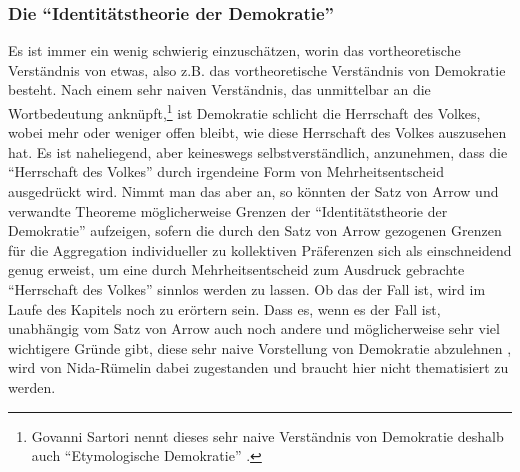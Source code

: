 \subsubsection{Die "`Identitätstheorie der Demokratie"'} 
    
Es ist immer ein wenig
schwierig einzuschätzen, worin das vortheoretische Verständnis von etwas, also
z.B. das vortheoretische Verständnis von Demokratie besteht. Nach einem sehr
naiven Verständnis, das unmittelbar an die Wortbedeutung
anknüpft,\footnote{Govanni Sartori nennt dieses sehr naive Verständnis
von Demokratie deshalb auch "`Etymologische Demokratie"' \cite[S.
29ff.]{sartori:1987}.} ist Demokratie schlicht die Herrschaft des Volkes, wobei
mehr oder weniger offen bleibt, wie diese Herrschaft des Volkes auszusehen hat.
Es ist naheliegend, aber keineswegs selbstverständlich, anzunehmen, dass die
"`Herrschaft des Volkes"' durch irgendeine Form von Mehrheitsentscheid
ausgedrückt wird. Nimmt man das aber an, so könnten der Satz von Arrow und
verwandte Theoreme möglicherweise Grenzen der "`Identitätstheorie der
Demokratie"' aufzeigen, sofern die durch den Satz von Arrow gezogenen Grenzen
für die Aggregation individueller zu kollektiven Präferenzen sich als einschneidend
genug erweist, um eine durch Mehrheitsentscheid zum Ausdruck gebrachte 
"`Herrschaft des Volkes"' sinnlos werden zu lassen. Ob das der Fall ist, wird
im Laufe des Kapitels noch zu erörtern sein. Dass es, wenn es der Fall ist,
unabhängig vom Satz von Arrow auch noch andere und möglicherweise sehr viel
wichtigere Gründe gibt, diese sehr naive Vorstellung von Demokratie abzulehnen
\cite[S. 29ff.]{sartori:1987}, wird von Nida-Rümelin dabei zugestanden
\cite[S. 185]{nida-ruemelin:1991} und braucht hier nicht thematisiert zu werden.

